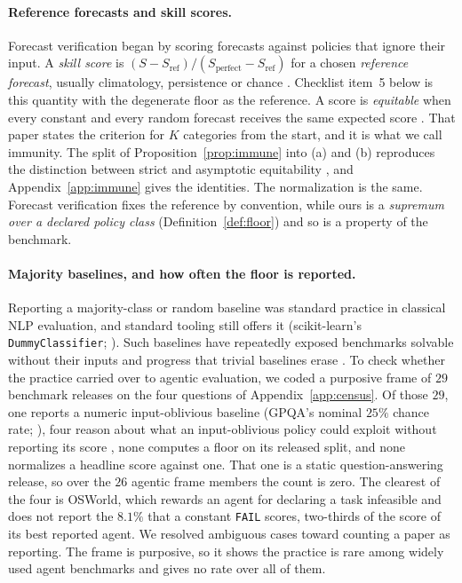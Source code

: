 \documentclass{article}
\theoremstyle{plain}
\theoremstyle{definition}
\begin{document}
\paragraph{Reference forecasts and skill scores.}
\label{sec:skillscore}
Forecast verification began by scoring forecasts against policies that ignore their input. A \emph{skill score} is $(S - S_{\mathrm{ref}})/(S_{\mathrm{perfect}} - S_{\mathrm{ref}})$ for a chosen \emph{reference forecast}, usually climatology, persistence or chance \citep{jolliffe2012verification}. Checklist item~5 below is this quantity with the degenerate floor as the reference. A score is \emph{equitable} when every constant and every random forecast receives the same expected score \citep{gandin1992equitable}. That paper states the criterion for $K$ categories from the start, and it is what we call immunity. The split of Proposition~\ref{prop:immune} into (a) and (b) reproduces the distinction between strict and asymptotic equitability \citep{peirce1884,heidke1926,hogan2010equitability}, and Appendix~\ref{app:immune} gives the identities. The normalization is the same. Forecast verification fixes the reference by convention, while ours is a \emph{supremum over a declared policy class} (Definition~\ref{def:floor}) and so is a property of the benchmark.

\paragraph{Majority baselines, and how often the floor is reported.}
\label{sec:census}
Reporting a majority-class or random baseline was standard practice in classical NLP evaluation, and standard tooling still offers it (scikit-learn's \texttt{DummyClassifier}; \citealp{pedregosa2011scikit}). Such baselines have repeatedly exposed benchmarks solvable without their inputs \citep{kaushik2018reading,poliak2018hypothesis,gururangan2018artifacts} and progress that trivial baselines erase \citep{ferraridacrema2019progress}. To check whether the practice carried over to agentic evaluation, we coded a purposive frame of $29$ benchmark releases on the four questions of Appendix~\ref{app:census}. Of those $29$, one reports a numeric input-oblivious baseline (GPQA's nominal $25\%$ chance rate; \citealp{rein2023gpqa}), four reason about what an input-oblivious policy could exploit without reporting its score \citep{wang2024mmlupro,zhou2024webarena,xie2024osworld,wang2024mint}, none computes a floor on its released split, and none normalizes a headline score against one. That one is a static question-answering release, so over the $26$ agentic frame members the count is zero. The clearest of the four is OSWorld, which rewards an agent for declaring a task infeasible and does not report the $8.1\%$ that a constant \texttt{FAIL} scores, two-thirds of the score of its best reported agent. We resolved ambiguous cases toward counting a paper as reporting. The frame is purposive, so it shows the practice is rare among widely used agent benchmarks and gives no rate over all of them.
\end{document}
